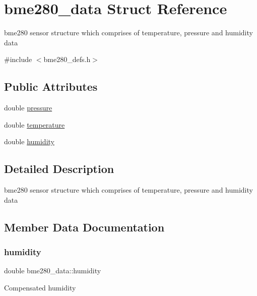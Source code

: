\hypertarget{structbme280__data}{}\section{bme280\+\_\+data Struct Reference}
\label{structbme280__data}


bme280 sensor structure which comprises of temperature, pressure and humidity data  




{\ttfamily \#include $<$bme280\+\_\+defs.\+h$>$}

\subsection*{Public Attributes}
\begin{DoxyCompactItemize}
\item 
double \hyperlink{structbme280__data_a45f80ad1a10a6704bb6f8dec70976c72}{pressure}
\item 
double \hyperlink{structbme280__data_a16a033ae72f60312e8528dde5a686154}{temperature}
\item 
double \hyperlink{structbme280__data_a0c38debcdec5946cccb553a970f9fa88}{humidity}
\end{DoxyCompactItemize}


\subsection{Detailed Description}
bme280 sensor structure which comprises of temperature, pressure and humidity data 

\subsection{Member Data Documentation}
\mbox{\label{structbme280__data_a0c38debcdec5946cccb553a970f9fa88}} 
\subsubsection{\texorpdfstring{humidity}{humidity}}
{\footnotesize\ttfamily double bme280\+\_\+data\+::humidity}

Compensated humidity \mbox{\label{structbme280__data_a45f80ad1a10a6704bb6f8dec70976c72}} 
